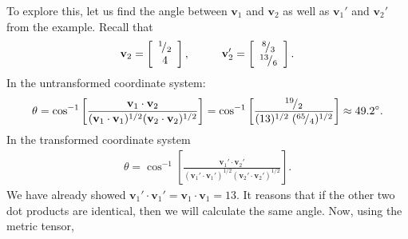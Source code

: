 To explore this, let us find the angle between $\mathbf{v}_1$ and $\mathbf{v}_2$ as well as $\mathbf{v}_1'$ and $\mathbf{v}_2'$ from the example. Recall that
\begin{align}
  \mathbf{v}_2  = \left[ \begin{array}{c} {}^{1}\!/_{2} \\ 4 \\ \end{array} \right] , \hspace{1cm} 
  \mathbf{v}_2' = \left[ \begin{array}{c} {}^{8}\!/_{3} \\ {}^{13}\!/_{6} \\ \end{array} \right]. \nonumber
\end{align}
In the untransformed coordinate system:
\begin{align}
  \theta = \cos^{-1} \left[ \frac{ \mathbf{v}_1 \cdot \mathbf{v}_2 }{ ( \mathbf{v}_1 \cdot \mathbf{v}_1 )^{1/2} (  \mathbf{v}_2 \cdot \mathbf{v}_2 )^{1/2} } \right] 
         = \cos^{-1} \left[ \frac{ {}^{19}\!/_{2} }{ ( 13 )^{1/2} \hspace{0.1cm} (  {}^{65}\!/_{4} )^{1/2} } \right]
  \approx 49.2^\circ. \nonumber
\end{align}
In the transformed coordinate system
\begin{align}
  \theta = \cos^{-1} \left[ \frac{ \mathbf{v}_1' \cdot \mathbf{v}_2' }{ ( \mathbf{v}_1' \cdot \mathbf{v}_1' )^{1/2} (  \mathbf{v}_2' \cdot \mathbf{v}_2' )^{1/2} } \right] . \nonumber
\end{align}
We have already showed $\mathbf{v}_1' \cdot \mathbf{v}_1' = \mathbf{v}_1 \cdot \mathbf{v}_1 = 13$. It reasons that if the other two dot products are identical, then we will calculate the same angle. Now, using the metric tensor,
